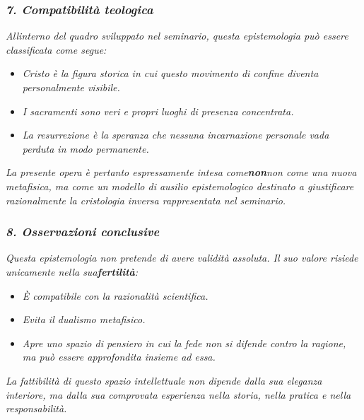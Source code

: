 \documentclass[
]{article}
\begin{document}
\subsubsection{\texorpdfstring{\emph{\textbf{7. Compatibilità teologica}}}{7. Compatibilità teologica}}\label{compatibilituxe0-teologica}

\emph{All\textquotesingle interno del quadro sviluppato nel seminario, questa epistemologia può essere classificata come segue:}

\begin{itemize}
\item
  \emph{Cristo è la figura storica in cui questo movimento di confine diventa personalmente visibile.}
\item
  \emph{I sacramenti sono veri e propri luoghi di presenza concentrata.}
\item
  \emph{La resurrezione è la speranza che nessuna incarnazione personale vada perduta in modo permanente.}
\end{itemize}

\emph{La presente opera è pertanto espressamente intesa come\textbf{non}non come una nuova metafisica, ma come un modello di ausilio epistemologico destinato a giustificare razionalmente la cristologia inversa rappresentata nel seminario.}

\subsubsection{\texorpdfstring{\emph{\textbf{8. Osservazioni conclusive}}}{8. Osservazioni conclusive}}\label{osservazioni-conclusive}

\emph{Questa epistemologia non pretende di avere validità assoluta. Il suo valore risiede unicamente nella sua\textbf{fertilità}:}

\begin{itemize}
\item
  \emph{È compatibile con la razionalità scientifica.}
\item
  \emph{Evita il dualismo metafisico.}
\item
  \emph{Apre uno spazio di pensiero in cui la fede non si difende contro la ragione, ma può essere approfondita insieme ad essa.}
\end{itemize}

\emph{La fattibilità di questo spazio intellettuale non dipende dalla sua eleganza interiore, ma dalla sua comprovata esperienza nella storia, nella pratica e nella responsabilità.}
\end{document}
